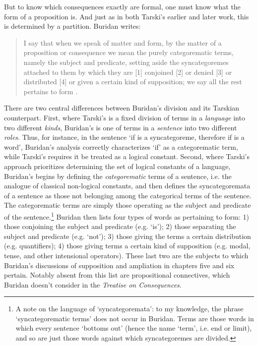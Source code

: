 \documentclass[]{article}
\begin{document}
But to know which consequences exactly are formal, one must know what the form of a proposition is. And just as in both Tarski's earlier and later work, this is determined by a partition. Buridan writes:

\begin{quote}
	I say that when we speak of matter and form, by the matter of a proposition or consequence we mean the purely categorematic terms, namely the subject and predicate, setting aside the syncategoremes attached to them by which they are [1] conjoined [2] or denied [3] or distributed [4] or given a certain kind of supposition; we say all the rest pertains to form \autocite[I. 7, 74]{Buridan2015}.
\end{quote}

There are two central differences between Buridan's division and its Tarskian counterpart. First, where Tarski's is a fixed division of terms in a \textit{language} into two different \textit{kinds}, Buridan's is one of terms in a \textit{sentence} into two different \textit{roles}. Thus, for instance, in the sentence `if is a syncategoreme, therefore if is a word', Buridan's analysis correctly characterizes `if' as a categorematic term, while Tarski's requires it be treated as a logical constant. Second, where Tarski's approach prioritizes determining the set of logical constants of a language, Buridan's begins by defining the \textit{categorematic} terms of a sentence, i.e. the analogue of classical non-logical constants, and then defines the syncategoremata of a sentence as those not belonging among the categorical terms of the sentence. The categorematic terms are simply those operating as the subject and predicate of the sentence.\footnote{A note on the language of `syncategoremata': to my knowledge, the phrase `syncategorematic terms' does not occur in Buridan. Terms are those words in which every sentence `bottoms out' (hence the name `term', i.e. end or limit), and so are just those words against which syncategoremes are divided.} Buridan then lists four types of words as pertaining to form: 1) those conjoining the subject and predicate (e.g. `is'); 2) those separating the subject and predicate (e.g. `not'); 3) those giving the terms a certain distribution (e.g. quantifiers); 4) those giving terms a certain kind of supposition (e.g. modal, tense, and other intensional operators). These last two are the subjects to which Buridan's discussions of supposition and ampliation in chapters five and six pertain. Notably absent from this list are propositional connectives, which Buridan doesn't consider in the \textit{Treatise on Consequences}.
\end{document}
